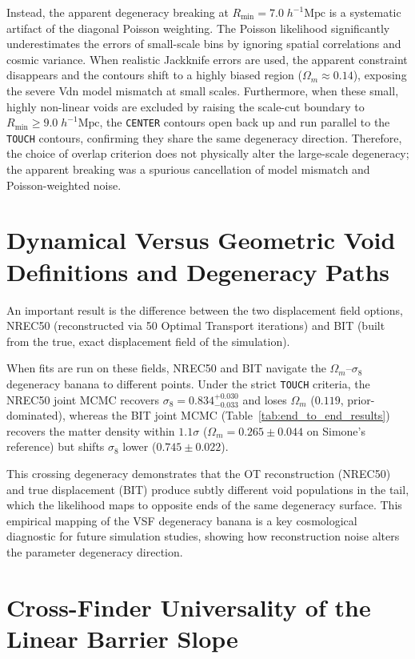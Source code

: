 \documentclass[12pt]{report}
\begin{document}
Instead, the apparent degeneracy breaking at $R_{\mathrm{min}} = 7.0\;h^{-1}\mathrm{Mpc}$ is a systematic artifact of the diagonal Poisson weighting. The Poisson likelihood significantly underestimates the errors of small-scale bins by ignoring spatial correlations and cosmic variance. When realistic Jackknife errors are used, the apparent constraint disappears and the contours shift to a highly biased region ($\Omega_m \approx 0.14$), exposing the severe Vdn model mismatch at small scales. Furthermore, when these small, highly non-linear voids are excluded by raising the scale-cut boundary to $R_{\mathrm{min}} \ge 9.0\;h^{-1}\mathrm{Mpc}$, the \texttt{CENTER} contours open back up and run parallel to the \texttt{TOUCH} contours, confirming they share the same degeneracy direction. Therefore, the choice of overlap criterion does not physically alter the large-scale degeneracy; the apparent breaking was a spurious cancellation of model mismatch and Poisson-weighted noise.

\section{Dynamical Versus Geometric Void Definitions and Degeneracy Paths}
\label{sec:discussion_definition}

An important result is the difference between the two displacement field options, NREC50 (reconstructed via 50 Optimal Transport iterations) and BIT (built from the true, exact displacement field of the simulation). 

When fits are run on these fields, NREC50 and BIT navigate the $\Omega_m$--$\sigma_8$ degeneracy banana to different points. Under the strict \texttt{TOUCH} criteria, the NREC50 joint MCMC recovers $\sigma_8 = 0.834^{+0.030}_{-0.033}$ and loses $\Omega_m$ ($0.119$, prior-dominated), whereas the BIT joint MCMC (Table~\ref{tab:end_to_end_results}) recovers the matter density within $1.1\sigma$ ($\Omega_m = 0.265 \pm 0.044$ on Simone's reference) but shifts $\sigma_8$ lower ($0.745 \pm 0.022$).

This crossing degeneracy demonstrates that the OT reconstruction (NREC50) and true displacement (BIT) produce subtly different void populations in the tail, which the likelihood maps to opposite ends of the same degeneracy surface. This empirical mapping of the VSF degeneracy banana is a key cosmological diagnostic for future simulation studies, showing how reconstruction noise alters the parameter degeneracy direction.

\section{Cross-Finder Universality of the Linear Barrier Slope}
\label{sec:discussion_universality}
\end{document}
